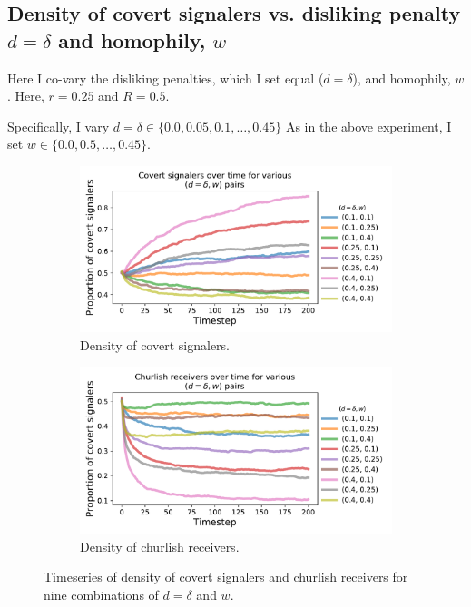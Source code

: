 \documentclass[11pt,letterpaper]{article}
\begin{document}
\subsection{Density of covert signalers vs. disliking penalty $d=\delta$ and homophily, $w$}

Here I co-vary the disliking penalties, which I set equal ($d=\delta$), and
homophily, $w$. Here, $r=0.25$ and $R=0.5$. 

Specifically, I vary $d=\delta \in \{0.0, 0.05, 0.1, \ldots, 0.45\}$
As in the above experiment, I set $w \in \{0.0, 0.5, \ldots, 0.45\}$.

\begin{figure}[H]

  \centering
  \begin{subfigure}{0.49\textwidth}
    \centering
    \includegraphics[width=\textwidth]{prelim/Figures/dislikingHomophilyCovertSeries.pdf}
    \caption{Density of covert signalers.}
  \end{subfigure}
  \begin{subfigure}{0.49\textwidth}
    \centering
    \includegraphics[width=\textwidth]{prelim/Figures/dislikingHomophilyChurlishSeries.pdf}
    \caption{Density of churlish receivers.}
  \end{subfigure}
  
  \caption{Timeseries of density of covert signalers and churlish receivers
    for nine combinations of $d=\delta$ and $w$.}
  \label{fig:dislikingHomophilySeries}
\end{figure}
\end{document}
